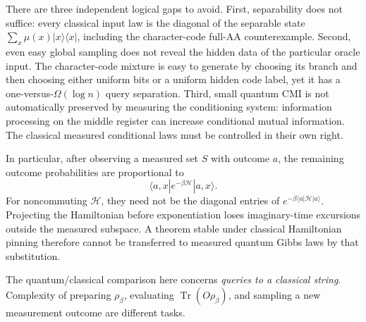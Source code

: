 There are three independent logical gaps to avoid. First, separability
does not suffice: every classical input law is the diagonal of the
separable state \(\sum_x\mu(x)|x\rangle\langle x|\), including the
character-code full-AA counterexample. Second, even easy global
sampling does not reveal the hidden data of the particular oracle
input. The character-code mixture is easy to generate by choosing its
branch and then choosing either uniform bits or a uniform hidden code
label, yet it has a one-versus-\(\Omega(\log n)\) query separation.
Third, small quantum CMI is not automatically preserved by measuring
the conditioning system: information processing on the middle register
can increase conditional mutual information. The classical measured
conditional laws must be controlled in their own right.

In particular, after observing a measured set \(S\) with outcome \(a\),
the remaining outcome probabilities are proportional to
\[
 \langle a,x|e^{-\beta\mathcal H}|a,x\rangle.
\]
For noncommuting \(\mathcal H\), they need not be the diagonal entries
of \(e^{-\beta\langle a|\mathcal H|a\rangle}\). Projecting the
Hamiltonian before exponentiation loses imaginary-time excursions
outside the measured subspace. A theorem stable under classical
Hamiltonian pinning therefore cannot be transferred to measured
quantum Gibbs laws by that substitution.

The quantum/classical comparison here concerns \emph{queries to a
classical string}. Complexity of preparing \(\rho_\beta\), evaluating
\(\operatorname{Tr}(O\rho_\beta)\), and sampling a new measurement
outcome are different tasks.

